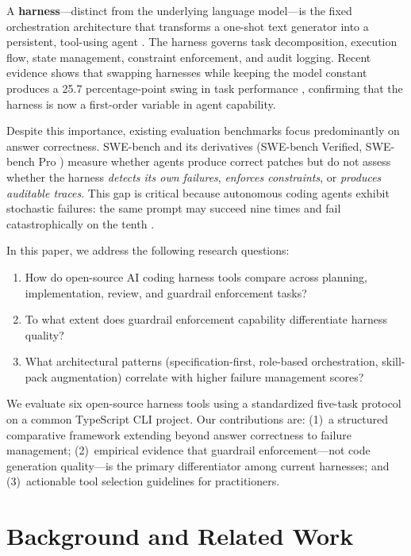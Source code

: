 \documentclass[11pt,a4paper]{article}
\begin{document}
A \textbf{harness}---distinct from the underlying language model---is the fixed orchestration architecture that transforms a one-shot text generator into a persistent, tool-using agent \cite{mindstudio2026harness}.
The harness governs task decomposition, execution flow, state management, constraint enforcement, and audit logging.
Recent evidence shows that swapping harnesses while keeping the model constant produces a 25.7 percentage-point swing in task performance \cite{mindstudio2026harness}, confirming that the harness is now a first-order variable in agent capability.

Despite this importance, existing evaluation benchmarks focus predominantly on answer correctness.
SWE-bench \cite{jimenez2024swebench} and its derivatives (SWE-bench Verified, SWE-bench Pro \cite{deng2025swebenchpro}) measure whether agents produce correct patches but do not assess whether the harness \emph{detects its own failures}, \emph{enforces constraints}, or \emph{produces auditable traces}.
This gap is critical because autonomous coding agents exhibit stochastic failures: the same prompt may succeed nine times and fail catastrophically on the tenth \cite{guardrailsmd2026}.

In this paper, we address the following research questions:

\begin{enumerate}[label=\textbf{RQ\arabic*:}]
  \item How do open-source AI coding harness tools compare across planning, implementation, review, and guardrail enforcement tasks?
  \item To what extent does guardrail enforcement capability differentiate harness quality?
  \item What architectural patterns (specification-first, role-based orchestration, skill-pack augmentation) correlate with higher failure management scores?
\end{enumerate}

\noindent We evaluate six open-source harness tools using a standardized five-task protocol on a common TypeScript CLI project.
Our contributions are:
(1)~a structured comparative framework extending beyond answer correctness to failure management;
(2)~empirical evidence that guardrail enforcement---not code generation quality---is the primary differentiator among current harnesses; and
(3)~actionable tool selection guidelines for practitioners.

\section{Background and Related Work}
\label{sec:related}
\end{document}
